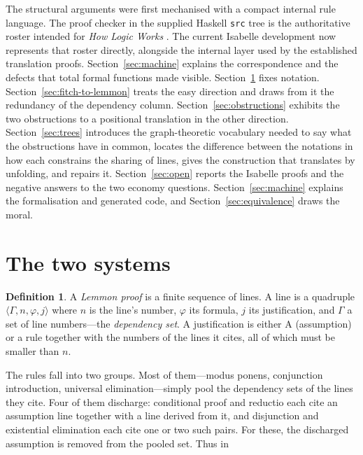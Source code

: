 \documentclass[11pt]{article}
\theoremstyle{plain}
\theoremstyle{definition}
\newtheorem{definition}[theorem]{Definition}
\theoremstyle{remark}
\begin{document}
The structural arguments were first mechanised with a compact internal rule
language. The proof checker in the supplied Haskell \verb|src| tree is the
authoritative roster intended for \emph{How Logic Works}
\cite{halvorson2020}. The current Isabelle development now represents that
roster directly, alongside the internal layer used by the established
translation proofs. Section~\ref{sec:machine} explains the correspondence and
the defects that total formal functions made visible.
Section~\ref{sec:systems} fixes notation.
Section~\ref{sec:fitch-to-lemmon} treats the easy direction and
draws from it the redundancy of the dependency column.
Section~\ref{sec:obstructions} exhibits the two obstructions to a positional
translation in the other direction. Section~\ref{sec:trees} introduces the
graph-theoretic vocabulary needed to say what the obstructions have in common,
locates the difference between the notations in how each constrains the
sharing of lines, gives the construction that translates by unfolding, and
repairs it. Section~\ref{sec:open} reports the Isabelle proofs and the negative
answers to the two economy questions. Section~\ref{sec:machine} explains the
formalisation and generated code, and
Section~\ref{sec:equivalence} draws the moral.

\section{The two systems}\label{sec:systems}

\begin{definition}
A \emph{Lemmon proof} is a finite sequence of lines. A line is a quadruple
$\langle \Gamma, n, \varphi, j\rangle$ where $n$ is the line's number,
$\varphi$ its formula, $j$ its justification, and $\Gamma$ a set of line
numbers---the \emph{dependency set}. A justification is either
$\mathrm{A}$ (assumption) or a rule together with the numbers of the lines it
cites, all of which must be smaller than $n$.
\end{definition}

The rules fall into two groups. Most of them---modus ponens, conjunction
introduction, universal elimination---simply pool the dependency sets of the
lines they cite. Four of them discharge: conditional proof and reductio each
cite an assumption line together with a line derived from it, and disjunction
and existential elimination each cite one or two such pairs. For these, the
discharged assumption is removed from the pooled set. Thus in
\end{document}
